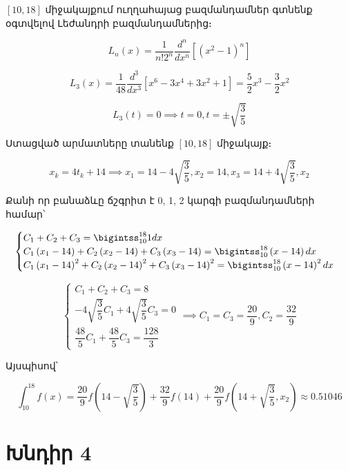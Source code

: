 \documentclass{article}
\begin{document}
\begin{enumerate}
$\left[10, 18\right]$ միջակայքում ուղղահայաց բազմանդամներ գտնենք օգտվելով Լեժանդրի բազմանդամներից։

			$$L_n\left(x\right) = \dfrac{1}{n ! 2 ^ {n}} \frac{d^n}{d x^{n}} \left[\left(x ^ {2} - 1\right) ^ {n} \right]$$

			$$L_3\left(x\right) = \dfrac{1}{48}\dfrac{d^3}{dx^{3}}\left[x ^ {6} - 3x^4 + 3x^2 +1\right] = \dfrac{5}{2} x^{3} - \dfrac{3}{2} x ^ {2}$$

			$$L_3\left(t\right) = 0 \implies t = 0, t = \pm \sqrt{\dfrac{3}{5}}$$

 
Ստացված արմատները տանենք $\left[10, 18\right]$ միջակայք։

							$$x_{k} = 4 t_{k} + 14 \implies x_{1} = 14 - 4 \sqrt{\dfrac{3}{5}}, x_{2} = 14, x_{3} = 14 + 4\sqrt{\dfrac{3}{5}}, x_{2}$$


Քանի որ բանաձևը ճշգրիտ է 0, 1, 2 կարգի բազմանդամների համար՝

$$
\begin{cases}
 C_{1} + C_{2} + C_{3} = \bigintss_{10}^{18}1dx \\
 C_{1}\left(x_{1} - 14\right) + C_{2}\left(x_{2} - 14\right) + C_{3}\left(x_{3} - 14\right) = \bigintss_{10}^{18}\left(x - 14\right)dx \\
 C_{1}\left(x_{1} - 14\right)^{2} + C_{2}\left(x_{2} - 14\right)^{2} + C_{3}\left(x_{3} - 14\right)^{2} = \bigintss_{10}^{18}\left(x - 14\right)^{2}dx

\end{cases}
$$

$$
\begin{cases}
 C_{1} + C_{2} + C_{3} = 8 \\
 -4\sqrt{\dfrac{3}{5}}C_{1}  + 4\sqrt{\dfrac{3}{5}} C_{3} = 0\\
\dfrac{48}{5}C_{1}+ \dfrac{48}{5} C_{3} = \dfrac{128}{3} 

\end{cases} \implies C_{1} = C_{3} = \dfrac{20}{9}, C_{2} = \dfrac{32}{9}
$$

Այսպիսով՝

			$$\int_{10}^{18} f \left(x\right) = \dfrac{20}{9} f\left(14 - \sqrt{\dfrac{3}{5}}\right)+\dfrac{32}{9} f\left(14\right)+\dfrac{20}{9} f\left(14 + \sqrt{\dfrac{3}{5}}, x_{2}\right) \approx 0.51046$$
\end{enumerate}

\newpage


\section*{Խնդիր 4}
\end{document}
